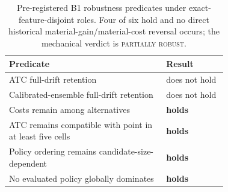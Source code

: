 \begin{table}[t]
\centering
\caption{Pre-registered B1 robustness predicates under exact-feature-disjoint roles.
Four of six hold and no direct historical material-gain/material-cost reversal occurs;
the mechanical verdict is \textsc{partially robust}.}
\label{tab:value_disjoint_b1_robustness}
\small
\begin{tabular}{p{0.72\linewidth} l}
\toprule
Predicate & Result \\
\midrule
ATC full-drift retention & does not hold \\
Calibrated-ensemble full-drift retention & does not hold \\
Costs remain among alternatives & \textbf{holds} \\
ATC remains compatible with point in at least five cells & \textbf{holds} \\
Policy ordering remains candidate-size-dependent & \textbf{holds} \\
No evaluated policy globally dominates & \textbf{holds} \\
\bottomrule
\end{tabular}
\end{table}

